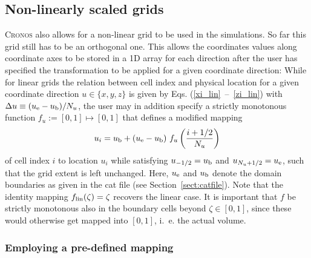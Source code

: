 \subsection{Non-linearly scaled grids}
\label{sect:nonlin-grid}


%

\textsc{Cronos} also allows for a non-linear grid to be used in the
simulations. So far this grid still has to be an orthogonal one.
This allows the coordinates values along coordinate axes to be stored
in a 1D array for each direction after the user has specified the
transformation to be applied for a given coordinate direction: While for
linear grids the relation between cell index and physical location for a
given coordinate direction $u \in \{x,y,z\}$ is given by Eqs.
\mbox{(\ref{xi_lin} -- \ref{zi_lin})} with
\mbox{$\Delta u \equiv (u_{\rm e}-u_{\rm b})/N_u$}, the user may in
addition specify a strictly monotonous function
\mbox{$f_u:= [0,1] \mapsto [0,1]$} that defines a modified mapping
\begin{equation}
  u_i = u_{\rm b} + (u_{\rm e}-u_{\rm b}) \ f_u \left(\frac{i+1/2}{N_u}\right)
\end{equation}
of cell index $i$ to location $u_i$ while satisfying $u_{-1/2}=u_{\rm b}$ and
 $u_{N_u+1/2}=u_{\rm e}$, such that the grid extent is left unchanged.
 Here, $u_{\rm e}$ and $u_{\rm b}$ denote
the domain boundaries as given in the cat file (see Section~\ref{sect:catfile}).
Note that the identity mapping \mbox{$f_{\rm lin}(\zeta) = \zeta$} recovers
the linear case.
It is important that $f$ be strictly monotonous also in the boundary cells
beyond $\zeta \in [0,1]$, since these would otherwise get mapped into
$[0,1]$, i.~e. the actual volume.


\subsubsection{Employing a pre-defined mapping}

